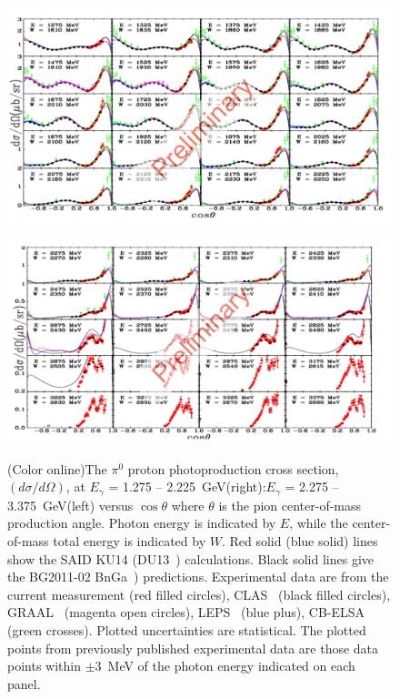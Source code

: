 \documentclass{aip-cp}
\begin{document}
\begin{figure}[h!]
	\centering
	\begin{minipage}{.50\textwidth}
		\centering
		\includegraphics[width=225 pt, height = 160 pt]{figures/pi0_xsectionI.pdf}
		\caption{}{}
		\label{fig:pi0I}
	\end{minipage}%
	\centering
	\begin{minipage}{.50\textwidth}
		\centering
		\includegraphics[width=225 pt, height = 160 pt]{figures/pi0_xsectionII.pdf}
		\caption{(Color online)The $\pi^0$ proton photoproduction cross section, $(d\sigma/d\Omega)$, at $E_{\gamma}$ = 1.275 -- 2.225~GeV(right):$E_{\gamma}$ = 2.275 -- 3.375~GeV(left) versus $\cos\theta$ where $\theta$ is the pion center-of-mass production angle. Photon energy is indicated by $E$, while the center-of-mass total energy is indicated by $W$. Red solid (blue solid) lines show the SAID KU14 (DU13~\protect\cite{Dugger13}) calculations. Black solid lines give the BG2011-02 BnGa~\protect\cite{BonnGat}) predictions. Experimental data are from the current measurement (red filled circles), CLAS~\protect\cite{Dugger07} (black filled circles), GRAAL~\protect\cite{Graal} (magenta open circles), LEPS~\protect\cite{LEPS} (blue plus), CB-ELSA~\protect\cite{ELSA05}~\cite{ELSA11} (green crosses). Plotted uncertainties are statistical. The plotted points from previously published experimental data are those data points within $\pm$3~MeV of the photon energy indicated on each panel.}{}
		\label{fig:pi0II}
	\end{minipage}
\end{figure}
\end{document}
